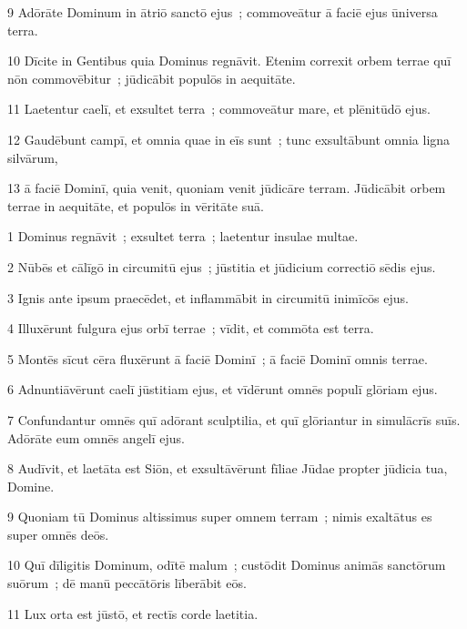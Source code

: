 \psalmVerse
  {\phantom{00}9}
  {Adōrāte Dominum in ātriō sanctō ejus~; commoveātur ā faciē ejus ūniversa terra.}


\psalmVerse
  {\phantom{0}10}
  {Dīcite in Gentibus quia Dominus regnāvit. Etenim correxit orbem terrae quī nōn commovēbitur~; jūdicābit populōs in aequitāte.}


\psalmVerse
  {\phantom{0}11}
  {Laetentur caelī, et exsultet terra~; commoveātur mare, et plēnitūdō ejus.}


\psalmVerse
  {\phantom{0}12}
  {Gaudēbunt campī, et omnia quae in eīs sunt~; tunc exsultābunt omnia ligna silvārum,}


\psalmVerse
  {\phantom{0}13}
  {ā faciē Dominī, quia venit, quoniam venit jūdicāre terram. Jūdicābit orbem terrae in aequitāte, et populōs in vēritāte suā.}



\psalmVerse
  {\phantom{00}1}
  {Dominus regnāvit~; exsultet terra~; laetentur insulae multae.}


\psalmVerse
  {\phantom{00}2}
  {Nūbēs et cālīgō in circumitū ejus~; jūstitia et jūdicium correctiō sēdis ejus.}


\psalmVerse
  {\phantom{00}3}
  {Ignis ante ipsum praecēdet, et inflammābit in circumitū inimīcōs ejus.}


\psalmVerse
  {\phantom{00}4}
  {Illuxērunt fulgura ejus orbī terrae~; vīdit, et commōta est terra.}


\psalmVerse
  {\phantom{00}5}
  {Montēs sīcut cēra fluxērunt ā faciē Dominī~; ā faciē Dominī omnis terrae.}


\psalmVerse
  {\phantom{00}6}
  {Adnuntiāvērunt caelī jūstitiam ejus, et vīdērunt omnēs populī glōriam ejus.}


\psalmVerse
  {\phantom{00}7}
  {Confundantur omnēs quī adōrant sculptilia, et quī glōriantur in simulācrīs suīs. Adōrāte eum omnēs angelī ejus.}


\psalmVerse
  {\phantom{00}8}
  {Audīvit, et laetāta est Siōn, et exsultāvērunt fīliae Jūdae propter jūdicia tua, Domine.}


\psalmVerse
  {\phantom{00}9}
  {Quoniam tū Dominus altissimus super omnem terram~; nimis exaltātus es super omnēs deōs.}


\psalmVerse
  {\phantom{0}10}
  {Quī dīligitis Dominum, odītē malum~; custōdit Dominus animās sanctōrum suōrum~; dē manū peccātōris līberābit eōs.}


\psalmVerse
  {\phantom{0}11}
  {Lux orta est jūstō, et rectīs corde laetitia.}


